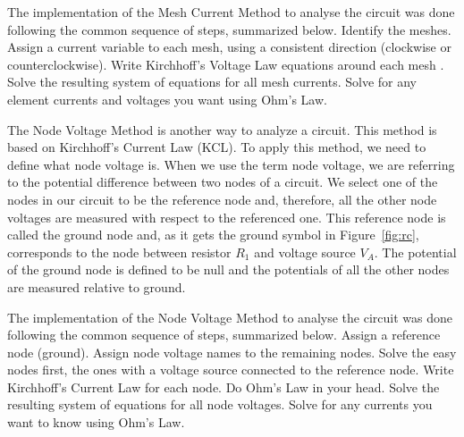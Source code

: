 The implementation of the Mesh Current Method to analyse the circuit was done following the common sequence of steps, summarized below.
    Identify the meshes.
    Assign a current variable to each mesh, using a consistent direction (clockwise or counterclockwise).
    Write Kirchhoff's Voltage Law equations around each mesh .
    Solve the resulting system of equations for all mesh currents.
    Solve for any element currents and voltages you want using Ohm's Law.

The Node Voltage Method is another way to analyze a circuit. This method is based on Kirchhoff's Current Law (KCL). To apply this method, we need to define what node voltage is. When we use the term node voltage, we are referring to the potential difference between two nodes of a circuit. We select one of the nodes in our circuit to be the reference node and, therefore, all the other node voltages are measured with respect to the referenced one. This reference node is called the ground node and, as it gets the ground symbol in Figure~\ref{fig:rc}, corresponds to the node between resistor $R_1$ and voltage source $V_A$. The potential of the ground node is defined to be null and the potentials of all the other nodes are measured relative to ground.

The implementation of the Node Voltage Method to analyse the circuit was done following the common sequence of steps, summarized below.
    Assign a reference node (ground).
    Assign node voltage names to the remaining nodes.
    Solve the easy nodes first, the ones with a voltage source connected to the reference node.
    Write Kirchhoff's Current Law for each node. Do Ohm's Law in your head.
    Solve the resulting system of equations for all node voltages.
    Solve for any currents you want to know using Ohm's Law.



